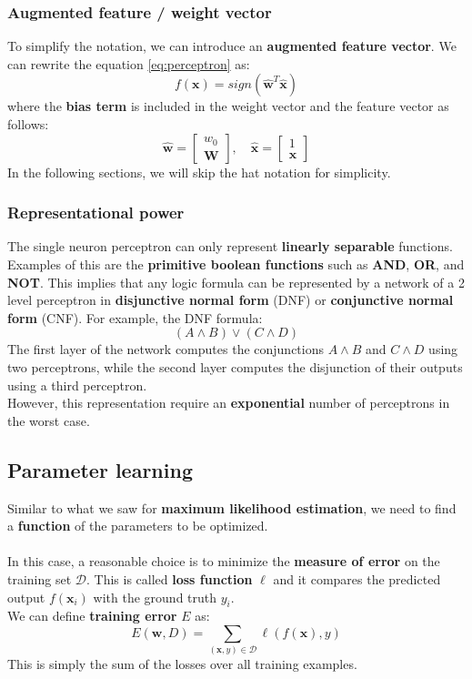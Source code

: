 \subsubsection{Augmented feature / weight vector}
To simplify the notation, we can introduce an \textbf{augmented feature vector}. We can rewrite the 
equation \eqref{eq:perceptron} as:
\begin{equation}
    f(\boldsymbol{x}) = sign(\hat{\boldsymbol{w}}^T \hat{\boldsymbol{x}})
\end{equation}
where the \textbf{bias term} is included in the weight vector and the feature vector as follows:
\[
    \hat{\boldsymbol{w}} = 
    \begin{bmatrix}
    w_0 \\
    \boldsymbol{W}
    \end{bmatrix}
    , \quad
    \hat{\boldsymbol{x}} = 
    \begin{bmatrix}
    1 \\
    \boldsymbol{x}
    \end{bmatrix}
\]
In the following sections, we will skip the hat notation for simplicity.

\subsubsection{Representational power}
The single neuron perceptron can only represent \textbf{linearly separable} functions. 
Examples of this are the \textbf{primitive boolean functions} such as \textbf{AND}, \textbf{OR}, and \textbf{NOT}.
This implies that any logic formula can be represented by a network of a 2 level perceptron in \textbf{disjunctive normal form} (DNF) or \textbf{conjunctive normal form} (CNF).
For example, the DNF formula:
\[(A \land B) \lor (C \land D)\]
The first layer of the network computes the conjunctions $A \land B$ and $C \land D$ using two perceptrons,
while the second layer computes the disjunction of their outputs using a third perceptron.
\\However, this representation require an \textbf{exponential} number of perceptrons in the worst case.

\subsection{Parameter learning}
Similar to what we saw for \textbf{maximum likelihood estimation}, we need to find a \textbf{function} of the parameters
to be optimized.
\\\\In this case, a reasonable choice is to minimize the \textbf{measure of error} on the training set $\mathcal{D}$. 
This is called \textbf{loss function} $\ell$ and it compares the predicted output $f(\boldsymbol{x}_i)$ 
with the ground truth $y_i$.
\\We can define \textbf{training error} $E$ as:
\begin{equation}
    \label{eq:misclassification_error}
    E(\boldsymbol{w}, D) = \sum_{(\boldsymbol{x},y) \in \mathcal{D}} \ell(f(\boldsymbol{x}), y)
\end{equation}
This is simply the sum of the losses over all training examples.

